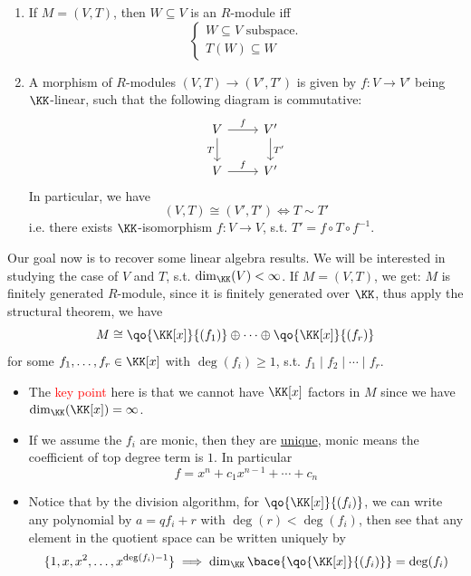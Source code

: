 \begin{exercise}
	\leavevmode
	\begin{enumerate}
		\item If \( M = (V,T) \), then \( W \subseteq V \) is an \( R \)-module iff
		      \[
			      \begin{cases}
				      W \subseteq V \text{ subspace.} \\
				      T(W) \subseteq W
			      \end{cases}
		      \]
		\item A morphism of \( R \)-modules \( (V,T) \to (V',T') \) is given by \( f: V \to V' \)
		      being \( \KK \)-linear, such that the following diagram is commutative:
		      \[
			      \begin{tikzcd}
				      V \arrow[r, "f"] \arrow[d, "T"'] & V' \arrow[d, "T'"] \\
				      V \arrow[r, "f"]                 & V'
			      \end{tikzcd}
		      \]
		      In particular, we have
		      \[
			      (V,T) \cong (V',T') \iff T \sim T'
		      \]
		      i.e. there exists \( \KK \)-isomorphism \( f: V \to V \), s.t. \( T' = f\circ T \circ f^{-1} \).
	\end{enumerate}
\end{exercise}
Our goal now is to recover some linear algebra results. We will be interested in studying the case
of \( V \) and \( T \), s.t. \( \dim_{\KK}(V) < \infty \). If \( M = (V,T) \), we get: \( M \) is
finitely generated \( R \)-module, since it is finitely generated over \( \KK \), thus apply the
structural theorem, we have
\[
	M \cong \qo{\KK[x]}{(f_1)} \oplus \cdots \oplus \qo{\KK[x]}{(f_r)}
\]
for some  \( f_1,\ldots, f_r \in \KK[x] \) with \( \deg(f_i) \geq 1 \), s.t. \( f_1 \mid f_2 \mid
\cdots \mid f_r \).
\begin{note}
	\leavevmode
	\begin{itemize}
		\item The \textcolor{red}{key point} here is that we cannot have \( \KK[x] \) factors in \( M \) since
		      we have \( \dim_{\KK}(\KK[x]) = \infty \).
		\item If we assume the \( f_i \) are monic, then they are \underline{unique}, monic means
		      the coefficient of top degree term is \( 1 \). In particular
		      \[
			      f = x^n + c_1 x^{n-1} + \cdots + c_n
		      \]
		\item Notice that by the division algorithm, for \( \qo{\KK[x]}{(f_i)} \), we can write any
		      polynomial by \( a = q f_i + r \) with \( \deg(r) < \deg(f_i) \), then see that any
		      element in the quotient space can be written uniquely by
		      \[
			      \{1,x,x^2,\ldots,x^{\deg(f_i) - 1}\} \implies \dim_{\KK}\bace{\qo{\KK[x]}{(f_i)}} = \deg(f_i)
		      \]
	\end{itemize}
\end{note}

